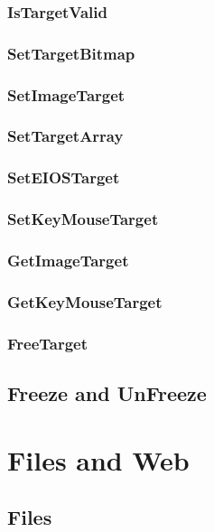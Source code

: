 \documentclass[a4paper]{report}
\begin{document}
{\subsection{IsTargetValid}

\subsection{SetTargetBitmap}

\subsection{SetImageTarget}

\subsection{SetTargetArray}

\subsection{SetEIOSTarget}

\subsection{SetKeyMouseTarget}

\subsection{GetImageTarget}

\subsection{GetKeyMouseTarget}

\subsection{FreeTarget}

\section{Freeze and UnFreeze}

\chapter{Files and Web}

\section{Files}

}
\end{document}
